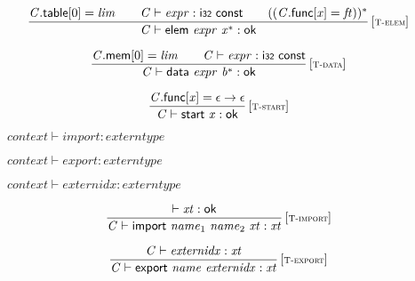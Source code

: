$$
\begin{array}{@{}c@{}}\displaystyle
\frac{
{\mathit{C}}.\mathsf{table}[0] = {\mathit{lim}}
 \qquad
{\mathit{C}} \vdash {\mathit{expr}} : \mathsf{i{\scriptstyle32}}~\mathsf{const}
 \qquad
(({\mathit{C}}.\mathsf{func}[{\mathit{x}}] = {\mathit{ft}}))^\ast
}{
{\mathit{C}} \vdash \mathsf{elem}~{\mathit{expr}}~{{\mathit{x}}^\ast} : \mathsf{ok}
} \, {[\textsc{\scriptsize T{-}elem}]}
\qquad
\end{array}
$$

$$
\begin{array}{@{}c@{}}\displaystyle
\frac{
{\mathit{C}}.\mathsf{mem}[0] = {\mathit{lim}}
 \qquad
{\mathit{C}} \vdash {\mathit{expr}} : \mathsf{i{\scriptstyle32}}~\mathsf{const}
}{
{\mathit{C}} \vdash \mathsf{data}~{\mathit{expr}}~{{\mathit{b}}^\ast} : \mathsf{ok}
} \, {[\textsc{\scriptsize T{-}data}]}
\qquad
\end{array}
$$

$$
\begin{array}{@{}c@{}}\displaystyle
\frac{
{\mathit{C}}.\mathsf{func}[{\mathit{x}}] = \epsilon \rightarrow \epsilon
}{
{\mathit{C}} \vdash \mathsf{start}~{\mathit{x}} : \mathsf{ok}
} \, {[\textsc{\scriptsize T{-}start}]}
\qquad
\end{array}
$$

\vspace{1ex}

$\boxed{{\mathit{context}} \vdash {\mathit{import}} : {\mathit{externtype}}}$

$\boxed{{\mathit{context}} \vdash {\mathit{export}} : {\mathit{externtype}}}$

$\boxed{{\mathit{context}} \vdash {\mathit{externidx}} : {\mathit{externtype}}}$

$$
\begin{array}{@{}c@{}}\displaystyle
\frac{
{ \vdash }\;{\mathit{xt}} : \mathsf{ok}
}{
{\mathit{C}} \vdash \mathsf{import}~{\mathit{name}}_{{1}}~{\mathit{name}}_{{2}}~{\mathit{xt}} : {\mathit{xt}}
} \, {[\textsc{\scriptsize T{-}import}]}
\qquad
\end{array}
$$

$$
\begin{array}{@{}c@{}}\displaystyle
\frac{
{\mathit{C}} \vdash {\mathit{externidx}} : {\mathit{xt}}
}{
{\mathit{C}} \vdash \mathsf{export}~{\mathit{name}}~{\mathit{externidx}} : {\mathit{xt}}
} \, {[\textsc{\scriptsize T{-}export}]}
\qquad
\end{array}
$$

\vspace{1ex}

